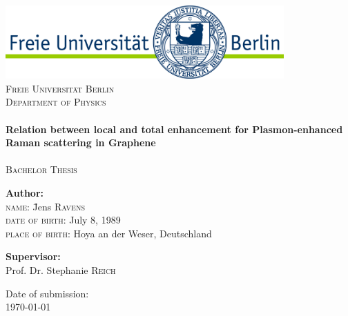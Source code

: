 
\begin{titlepage}

\begin{center}

\includegraphics[width=0.8\textwidth]{./images/free-university.jpg}\\[1cm]

\textsc{\LARGE Freie Universität Berlin}\\[0.3cm]
\textsc{\LARGE Department of Physics}\\[1.5cm]
\HRule \\[0.4cm]
{ \huge \bfseries Relation between local and total enhancement for Plasmon-enhanced Raman scattering in Graphene}\\[0.4cm]

\HRule \\[1cm]

\textsc{\Large Bachelor Thesis}\\[2cm]

\begin{flushleft} \large
\begin{tabbing}
\textbf{Author:}\\
\textsc{name:} \hspace{3cm} \= Jens \textsc{Ravens} \\
\textsc{date of birth:} \> July 8, 1989 \\
\textsc{place of birth:} \> Hoya an der Weser, Deutschland
\end{tabbing}
\end{flushleft}
\begin{flushleft} \large
\textbf{Supervisor:} \\
Prof. Dr. Stephanie \textsc{Reich}
\end{flushleft}

\vfill

{\large Date of submission: \\ \today}

\end{center}

\end{titlepage}
